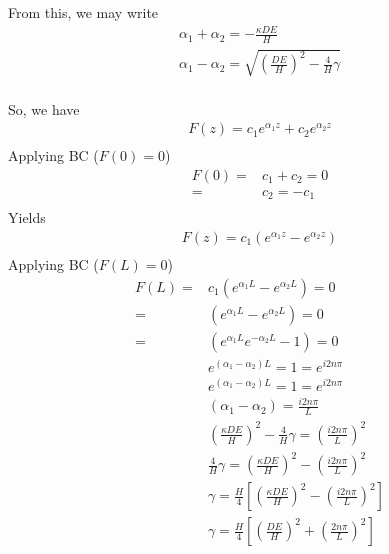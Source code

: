 \documentclass[11pt]{article}
\begin{document}
From this, we may write
\begin{equation}\begin{aligned}
	\alpha_1 + \alpha_2 = -\frac{\kappa DE}{H} \\
	\alpha_1 - \alpha_2 = \sqrt{\left(\frac{DE}{H}\right)^2 - \frac{4}{H} \gamma} \\
\end{aligned} \end{equation}

So, we have
\begin{equation}\begin{aligned}
	F(z) = c_1 e^{\alpha_1 z} + c_2 e^{\alpha_2 z} \\
\end{aligned} \end{equation}
Applying BC ($F(0) = 0$)
\begin{equation}\begin{aligned}
	F(0) = & c_1 + c_2 = 0 \\
	     = & c_2 =-c_1  \\
\end{aligned} \end{equation}
Yields
\begin{equation}\begin{aligned}
	F(z) = c_1 (e^{\alpha_1 z} - e^{\alpha_2 z}) \\
\end{aligned} \end{equation}
Applying BC ($F(L) = 0$)
\begin{equation}\begin{aligned}
	F(L) = & c_1 (e^{\alpha_1 L} - e^{\alpha_2 L}) = 0 \\
	     = &     (e^{\alpha_1 L} - e^{\alpha_2 L}) = 0 \\
	     = &     (e^{\alpha_1 L}e^{-\alpha_2 L} - 1) = 0 \\
	       &     e^{(\alpha_1-\alpha_2) L} = 1 = e^{i2n\pi} \\
	       &     e^{(\alpha_1-\alpha_2) L} = 1 = e^{i2n\pi} \\
	       &     (\alpha_1-\alpha_2) = \frac{i2n\pi}{L} \\
	       &     \left(\frac{\kappa DE}{H}\right)^2 - \frac{4}{H} \gamma = \left( \frac{i2n\pi}{L} \right)^2 \\
	       &     \frac{4}{H} \gamma = \left(\frac{\kappa DE}{H}\right)^2 - \left( \frac{i2n\pi}{L} \right)^2 \\
	       &     \gamma = \frac{H}{4} \left[ \left(\frac{\kappa DE}{H}\right)^2 - \left( \frac{i2n\pi}{L} \right)^2  \right]\\
	       &     \gamma = \frac{H}{4} \left[ \left(\frac{DE}{H}\right)^2 + \left( \frac{2n\pi}{L} \right)^2  \right]\\
\end{aligned} \end{equation}
\end{document}

